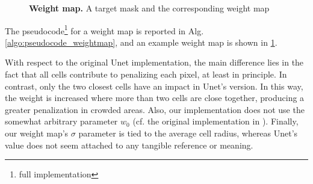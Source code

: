 %
\begin{figure}
    \centering
    \caption{\textbf{Weight map.} A target mask and the corresponding weight map}
    \label{fig:weight_map_example}
\end{figure}
%
The pseudocode\footnote{full implementation \githubweights} for a weight map is reported in Alg. \ref{algo:pseudocode_weightmap}, and an example weight map is shown in \cref{fig:weight_map_example}.

With respect to the original Unet implementation, the main difference lies in the fact that all cells contribute to penalizing each pixel, at least in principle. In contrast, only the two closest cells have an impact in Unet's version.
In this way, the weight is increased where more than two cells are close together, producing a greater penalization in crowded areas.
Also, our implementation does not use the somewhat arbitrary parameter $w_0$ (cf. the original implementation in ).
Finally, our weight map's $\sigma$ parameter is tied to the average cell radius, whereas Unet's value does not seem attached to any tangible reference or meaning.

